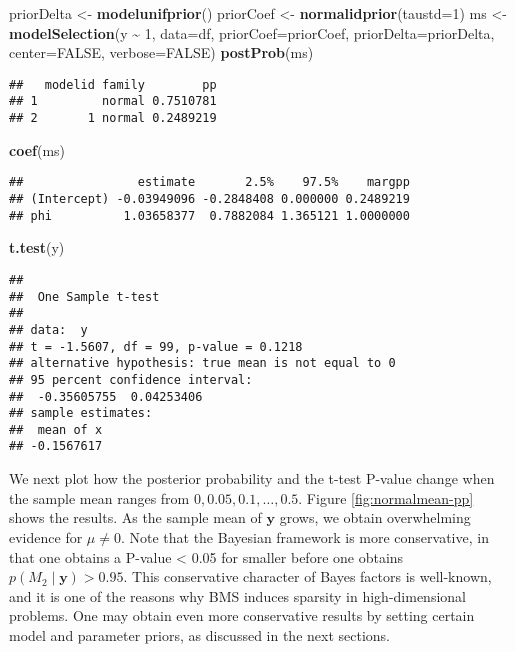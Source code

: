 \documentclass[
]{book}
\newenvironment{Shaded}{\begin{snugshade}}{\end{snugshade}}
\newcommand{\AttributeTok}[1]{\textcolor[rgb]{0.13,0.29,0.53}{#1}}
\newcommand{\ConstantTok}[1]{\textcolor[rgb]{0.56,0.35,0.01}{#1}}
\newcommand{\DecValTok}[1]{\textcolor[rgb]{0.00,0.00,0.81}{#1}}
\newcommand{\FunctionTok}[1]{\textcolor[rgb]{0.13,0.29,0.53}{\textbf{#1}}}
\newcommand{\NormalTok}[1]{#1}
\newcommand{\OtherTok}[1]{\textcolor[rgb]{0.56,0.35,0.01}{#1}}
\newcommand{\SpecialCharTok}[1]{\textcolor[rgb]{0.81,0.36,0.00}{\textbf{#1}}}
\newcommand{\by}{\mathbf{y}}
\theoremstyle{definition}
\theoremstyle{definition}
\theoremstyle{definition}
\theoremstyle{definition}
\theoremstyle{remark}
\begin{document}
\begin{Shaded}
\begin{Highlighting}[]
\NormalTok{priorDelta }\OtherTok{\textless{}{-}} \FunctionTok{modelunifprior}\NormalTok{()}
\NormalTok{priorCoef }\OtherTok{\textless{}{-}} \FunctionTok{normalidprior}\NormalTok{(}\AttributeTok{taustd=}\DecValTok{1}\NormalTok{)}
\NormalTok{ms }\OtherTok{\textless{}{-}} \FunctionTok{modelSelection}\NormalTok{(y }\SpecialCharTok{\textasciitilde{}} \DecValTok{1}\NormalTok{, }\AttributeTok{data=}\NormalTok{df, }\AttributeTok{priorCoef=}\NormalTok{priorCoef, }\AttributeTok{priorDelta=}\NormalTok{priorDelta, }\AttributeTok{center=}\ConstantTok{FALSE}\NormalTok{, }\AttributeTok{verbose=}\ConstantTok{FALSE}\NormalTok{)}
\FunctionTok{postProb}\NormalTok{(ms)}
\end{Highlighting}
\end{Shaded}

\begin{verbatim}
##   modelid family        pp
## 1         normal 0.7510781
## 2       1 normal 0.2489219
\end{verbatim}

\begin{Shaded}
\begin{Highlighting}[]
\FunctionTok{coef}\NormalTok{(ms)}
\end{Highlighting}
\end{Shaded}

\begin{verbatim}
##                estimate       2.5%    97.5%    margpp
## (Intercept) -0.03949096 -0.2848408 0.000000 0.2489219
## phi          1.03658377  0.7882084 1.365121 1.0000000
\end{verbatim}

\begin{Shaded}
\begin{Highlighting}[]
\FunctionTok{t.test}\NormalTok{(y)}
\end{Highlighting}
\end{Shaded}

\begin{verbatim}
## 
##  One Sample t-test
## 
## data:  y
## t = -1.5607, df = 99, p-value = 0.1218
## alternative hypothesis: true mean is not equal to 0
## 95 percent confidence interval:
##  -0.35605755  0.04253406
## sample estimates:
##  mean of x 
## -0.1567617
\end{verbatim}

We next plot how the posterior probability and the t-test P-value change when the sample mean ranges from \(0, 0.05, 0.1, \ldots, 0.5\).
Figure \ref{fig:normalmean-pp} shows the results.
As the sample mean of \(\by\) grows, we obtain overwhelming evidence for \(\mu \neq 0\).
Note that the Bayesian framework is more conservative, in that one obtains a P-value \textless{} 0.05 for smaller before one obtains \(p(M_2 \mid \by) > 0.95\). This conservative character of Bayes factors is well-known, and it is one of the reasons why BMS induces sparsity in high-dimensional problems. One may obtain even more conservative results by setting certain model and parameter priors, as discussed in the next sections.
\end{document}
